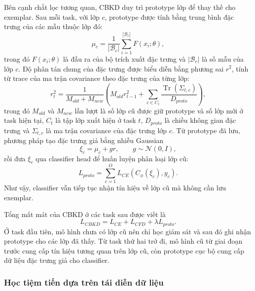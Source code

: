 Bên cạnh chắt lọc tương quan, CBKD duy trì prototype lớp để thay thế cho exemplar. Sau mỗi task, với lớp $c$, prototype được tính bằng trung bình đặc trưng của các mẫu thuộc lớp đó:
$$
\mu_c=\frac{1}{|\mathcal{B}_c|}\sum_{i=1}^{|\mathcal{B}_c|}F(x_i;\theta),
$$
trong đó $F(x_i;\theta)$ là đầu ra của bộ trích xuất đặc trưng và $|\mathcal{B}_c|$ là số mẫu của lớp $c$. Độ phân tán chung của đặc trưng được biểu diễn bằng phương sai $r^2$, tính từ trace của ma trận covariance theo đặc trưng của từng lớp:
$$
r_t^2=\frac{1}{M_{old}+M_{new}}\left(M_{old}r_{t-1}^2+
\sum_{c\in C_t}\frac{\operatorname{Tr}(\Sigma_{t,c})}{D_{proto}}\right),
$$
trong đó $M_{old}$ và $M_{new}$ lần lượt là số lớp cũ được giữ prototype và số lớp mới ở task hiện tại, $C_t$ là tập lớp xuất hiện ở task $t$, $D_{proto}$ là chiều không gian đặc trưng và $\Sigma_{t,c}$ là ma trận covariance của đặc trưng lớp $c$. Từ prototype đã lưu, phương pháp tạo đặc trưng giả bằng nhiễu Gaussian
$$
\xi_c=\mu_c+g r, \qquad g\sim\mathcal{N}(0,I),
$$
rồi đưa $\xi_c$ qua classifier head để huấn luyện phân loại lớp cũ:
$$
L_{proto}=\sum_{c=1}^{O}L_{CE}(C_\phi(\xi_c),y_c).
$$
Như vậy, classifier vẫn tiếp tục nhận tín hiệu về lớp cũ mà không cần lưu exemplar.

Tổng mất mát của CBKD ở các task sau được viết là
$$
L_{CBKD}=L_{CE}+L_{CFD}+\lambda L_{proto}.
$$
Ở task đầu tiên, mô hình chưa có lớp cũ nên chỉ học giám sát và sau đó ghi nhận prototype cho các lớp đã thấy. Từ task thứ hai trở đi, mô hình cũ từ giai đoạn trước cung cấp tín hiệu tương quan trên lớp cũ, còn prototype cục bộ cung cấp dữ liệu đặc trưng giả cho classifier.

\subsubsection{Học tiệm tiến dựa trên tái diễn dữ liệu}


